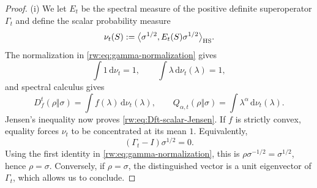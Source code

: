 \documentclass[11pt]{article}
\theoremstyle{remark}
\newcommand{\1}{\mathbbm{1}}
\begin{document}
\begin{proof}
(i) We let $E_t$ be the spectral measure of the positive definite
superoperator $\Gamma_t$ and define the scalar probability measure
\begin{equation}
 \nu_t(S):=
 \big\langle\sigma^{1/2},E_t(S)\sigma^{1/2}
 \big\rangle_{\rm HS}.
 \label{rw:eq:cyclic-spectral-measure}
\end{equation}
The normalization in \eqref{rw:eq:gamma-normalization} gives
\begin{equation}
 \int 1\,\mathrm d\nu_t=1,
 \qquad
 \int\lambda\,\mathrm d\nu_t(\lambda)=1,
 \label{rw:eq:cyclic-spectral-moments}
\end{equation}
and spectral calculus gives
\begin{equation}
 D_f^t(\rho\Vert\sigma)
 =\int f(\lambda)\,\mathrm d\nu_t(\lambda),
 \qquad
 Q_{\alpha,t}(\rho\Vert\sigma)
 =\int\lambda^\alpha\,\mathrm d\nu_t(\lambda).
 \label{rw:eq:cyclic-spectral-representation}
\end{equation}
Jensen's inequality now proves
\eqref{rw:eq:Dft-scalar-Jensen}.  If $f$ is strictly convex, equality
forces $\nu_t$ to be concentrated at its mean $1$.  Equivalently,
\begin{equation}
 (\Gamma_t-I)\sigma^{1/2}=0.
\end{equation}
Using the first identity in \eqref{rw:eq:gamma-normalization}, this is
$\rho\sigma^{-1/2}=\sigma^{1/2}$, hence $\rho=\sigma$.  Conversely,
if $\rho=\sigma$, the distinguished vector is a unit eigenvector of
$\Gamma_t$, which allows us to conclude.

\vspace{0.2cm}


\end{proof}
\end{document}
